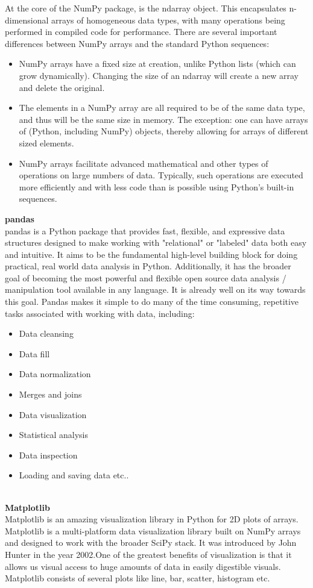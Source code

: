 \documentclass[12pt]{article}
\begin{document}
At the core of the NumPy package, is the ndarray object. This encapsulates n-dimensional arrays of homogeneous data types, with many operations being performed in compiled code for performance. There are several important differences between NumPy arrays and the standard Python sequences:
\begin{itemize}
\item NumPy arrays have a fixed size at creation, unlike Python lists (which can grow dynamically). Changing the size of an ndarray will create a new array and delete the original.
\item The elements in a NumPy array are all required to be of the same data type, and thus will be the same size in memory. The exception: one can have arrays of (Python, including NumPy) objects, thereby allowing for arrays of different sized elements.
\item NumPy arrays facilitate advanced mathematical and other types of operations on large numbers of data. Typically, such operations are executed more efficiently and with less code than is possible using Python’s built-in sequences.
\end{itemize}
\textbf{pandas}
\\
pandas is a Python package that provides fast, flexible, and expressive data structures designed to make working with "relational" or "labeled" data both easy and intuitive. It aims to be the fundamental high-level building block for doing practical, real world data analysis in Python. Additionally, it has the broader goal of becoming the most powerful and flexible open source data analysis / manipulation tool available in any language. It is already well on its way towards this goal.
Pandas makes it simple to do many of the time consuming, repetitive tasks associated with working with data, including:
\begin{itemize}
\item Data cleansing
\item Data fill
\item Data normalization
\item Merges and joins
\item Data visualization
\item Statistical analysis
\item Data inspection
\item Loading and saving data etc..
\end{itemize}
\\
\textbf{Matplotlib}
\\
Matplotlib is an amazing visualization library in Python for 2D plots of arrays. Matplotlib is a multi-platform data visualization library built on NumPy arrays and designed to work with the broader SciPy stack. It was introduced by John Hunter in the year 2002.One of the greatest benefits of visualization is that it allows us visual access to huge amounts of data in easily digestible visuals. Matplotlib consists of several plots like line, bar, scatter, histogram etc.
\end{document}
